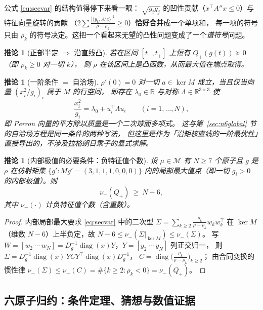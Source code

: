 \documentclass[UTF8,11pt]{ctexart}
\newtheorem{corollary}[theorem]{推论}
\theoremstyle{definition}
\newcommand{\R}{\mathbb{R}}
\begin{document}
公式 \eqref{eq:secvar} 的结构值得停下来看一眼：
$\sqrt{g_ig_j}$ 的凹性贡献（$x^\top A''x\le0$）与特征向量旋转的贡献
（$2\sum\frac{|\langle y_k,A'x\rangle|^2}{\rho-\rho_k}\ge0$）\textbf{恰好合并}成一个单项和，
每一项的符号只由 $\rho_k$ 的符号决定。这把一个看起来无望的凸性问题变成了一个\emph{谱符号}问题。

\begin{corollary}[正部半定 $\Rightarrow$ 沿直线凸]\label{cor:psdconvex}
若在区间 $[t_-,t_+]$ 上恒有 $Q_+(g(t))\succeq0$（即 $\rho_k\ge0$ 对一切 $k$），
则 $\rho$ 在该区间上是凸函数，从而最大值在端点取得。
\end{corollary}

\begin{corollary}[一阶条件 $=$ 自洽场]\label{cor:scf}
$\rho'(0)=0$ 对一切 $a\in\ker M$ 成立，当且仅当向量 $(x_i^2/g_i)_i$ 属于 $M$ 的行空间，
即存在 $\lambda_0\in\R$ 与对称 $\Lambda\in\R^{3\times3}$ 使
\begin{equation}\label{eq:scfnew}
\frac{x_i^2}{g_i}=\lambda_0+u_i^\top\Lambda u_i\qquad(i=1,\dots,N),
\end{equation}
即 Perron 向量的平方除以质量是一个\emph{二次球面多项式}。
这与第~\ref{sec:n6global} 节的自洽场方程是同一条件的两种写法，
但这里是作为「沿矩核直线的一阶最优性」直接导出的，不涉及拉格朗日乘子的显式求解。
\end{corollary}

\begin{corollary}[内部极值的必要条件：负特征值个数]\label{cor:nuneg}
设 $\mu\in\mathcal M$ 有 $N\ge7$ 个原子且 $g$ 是 $\rho$ 在仿射矩集
$\{g':Mg'=(3,1,1,1,0,0,0)\}$ 内的局部最大值点（即一切 $g_i>0$ 的内部极值）。则
\[
\nu_-(Q_+)\ \ge\ N-6 ,
\]
其中 $\nu_-(\cdot)$ 计负特征值个数（含重数）。
\end{corollary}

\begin{proof}
内部局部最大要求 \eqref{eq:secvar} 中的二次型 $\Sigma=\sum_{k\ge2}\frac{\rho_k}{\rho-\rho_k}w_kw_k^\top$
在 $\ker M$（维数 $N-6$）上半负定，故 $N-6\le\nu_-(\Sigma|_{\ker M})\le\nu_-(\Sigma)$。
写 $W=[w_2\ \cdots\ w_N]=D_g^{-1}\operatorname{diag}(x)Y$，$Y=[y_2\ \cdots\ y_N]$ 列正交归一，
则 $\Sigma=D_g^{-1}\operatorname{diag}(x)\,YC Y^\top\operatorname{diag}(x)D_g^{-1}$，
$C=\operatorname{diag}\bigl(\frac{\rho_k}{\rho-\rho_k}\bigr)_{k\ge2}$；
由合同变换的惯性律 $\nu_-(\Sigma)\le\nu_-(C)=\#\{k\ge2:\rho_k<0\}=\nu_-(Q_+)$。
\end{proof}

\subsection{六原子归约：条件定理、猜想与数值证据}\label{sec:harm:reduce}
\end{document}
